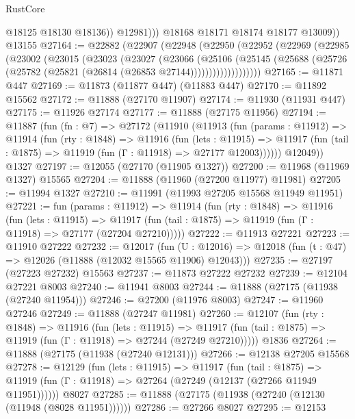 \begin{lexlean}{RustCore}
\begin{coremodule}
                  @18125
                  @18130
                  @18136))
              @12981)))
        @18168
        @18171
        @18174
        @18177
        @13009))
    @13155
@27164 := @22882
    (@22907
      (@22948
        (@22950
          (@22952
            (@22969
              (@22985
                (@23002
                  (@23015
                    (@23023
                      (@23027
                        (@23066
                          (@25106
                            (@25145
                              (@25688
                                (@25726 (@25782 (@25821 (@26814 (@26853 @27144)))))))))))))))))))
@27165 := @11871 @447
@27169 := @11873 (@11877 @447) (@11883 @447)
@27170 := @11892 @15562
@27172 := @11888 (@27170 @11907)
@27174 := @11930 (@11931 @447)
@27175 := @11926 @27174
@27177 := @11888 (@27175 @11956)
@27194 := @11887
    (fun (fn : @7) =>
    @27172
      (@11910
        (@11913
          (fun (params : @11912) =>
          @11914
            (fun (rty : @1848) =>
            @11916
              (fun (lets : @11915) =>
              @11917 (fun (tail : @1875) => @11919 (fun (Γ : @11918) => @27177 @12003))))))
        @12049))
    @1327
@27197 := @12055 (@27170 (@11905 @1327))
@27200 := @11968 (@11969 @1327) @15565
@27204 := @11888 (@11960 (@27200 @11977) @11981)
@27205 := @11994 @1327
@27210 := @11991 (@11993 @27205 @15568 @11949 @11951)
@27221 := fun (params : @11912) =>
  @11914
    (fun (rty : @1848) =>
    @11916
      (fun (lets : @11915) =>
      @11917 (fun (tail : @1875) => @11919 (fun (Γ : @11918) => @27177 (@27204 @27210)))))
@27222 := @11913 @27221
@27223 := @11910 @27222
@27232 := @12017
    (fun (U : @12016) => @12018 (fun (t : @47) => @12026 (@11888 (@12032 @15565 @11906) @12043)))
@27235 := @27197 (@27223 @27232) @15563
@27237 := @11873 @27222 @27232
@27239 := @12104 @27221 @8003
@27240 := @11941 @8003
@27244 := @11888 (@27175 (@11938 (@27240 @11954)))
@27246 := @27200 (@11976 @8003)
@27247 := @11960 @27246
@27249 := @11888 (@27247 @11981)
@27260 := @12107
    (fun (rty : @1848) =>
    @11916
      (fun (lets : @11915) =>
      @11917 (fun (tail : @1875) => @11919 (fun (Γ : @11918) => @27244 (@27249 @27210)))))
    @1836
@27264 := @11888 (@27175 (@11938 (@27240 @12131)))
@27266 := @12138 @27205 @15568
@27278 := @12129
    (fun (lets : @11915) =>
    @11917
      (fun (tail : @1875) =>
      @11919 (fun (Γ : @11918) => @27264 (@27249 (@12137 (@27266 @11949 @11951))))))
    @8027
@27285 := @11888 (@27175 (@11938 (@27240 (@12130 (@11948 (@8028 @11951))))))
@27286 := @27266 @8027
@27295 := @12153

\end{coremodule}
\end{lexlean}
